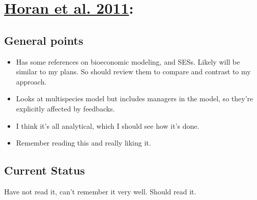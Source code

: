 \documentclass[a4paper,10pt]{article}
\begin{document}
\section*{\href{run:Managing ecological thresholds in coupled environm.pdf alias}{\color{Blue}Horan et al. 2011}:}

\subsection*{General points}
\begin{itemize}
\item Has some references on bioeconomic modeling, and SESs. Likely will be similar to my plans. So should review them to compare and contrast to my approach. 
\item Looks at multispecies model but includes managers in the model, so they're explicitly affected by feedbacks.
\item I think it's all analytical, which I should see how it's done. 
\item Remember reading this and really liking it. 
\end{itemize}

\subsection*{Current Status}
Have not read it, can't remember it very well. Should read it. 



\end{document}
